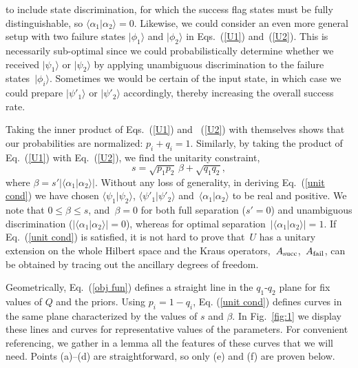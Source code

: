 \documentclass[aps,pra,twocolumn,showpacs]{revtex4-1}
\begin{document}
{to include state discrimination, for which the success flag states must be fully distinguishable, so $\langle\alpha_1|\alpha_2\rangle=0$.
%
Likewise, we could consider an even more general setup with two failure states $|\phi_1\rangle$ and $|\phi_2\rangle$ in Eqs.~(\ref{U1}) and~(\ref{U2}). This is necessarily sub-optimal since we could probabilistically determine whether we received $|{\psi_1}\rangle$ or $|{\psi_2}\rangle$ by applying unambiguous discrimination to the failure states~$| {\phi_i}\rangle$.  Sometimes we would be  certain of the input state, in which case we could  prepare $|\psi'_1\rangle$ or $|\psi'_2\rangle$ accordingly,  thereby increasing the overall success rate.
%
%

Taking the inner product of Eqs.~(\ref{U1}) and ~(\ref{U2}) with themselves shows that our probabilities are normalized: $p_i+q_i=1$.
Similarly, by taking the product of Eq.~(\ref{U1}) with Eq.~(\ref{U2}), we find the unitarity constraint,
%
\begin{equation}
s=\sqrt{p_1 p_2}\, \beta+\sqrt{q_1 q_2},
\label{unit cond}
\end{equation}
%
where $\beta=s' |\langle \alpha_1|\alpha_2\rangle|$. Without any loss of generality, in deriving Eq.~(\ref{unit cond}) we have chosen
$\langle {\psi_1}|{\psi_2}\rangle$, $\langle {\psi'_1}|{\psi'_2}\rangle$ and~$\langle\alpha_1|\alpha_2\rangle$ to be real and positive.
We note that $0\le\beta\le s$, and~$\beta=0$ for both full separation ($s'=0$) and unambiguous discrimination ($ |\langle \alpha_1|\alpha_2\rangle|=0$), whereas for optimal separation~$|\langle \alpha_1|\alpha_2\rangle|=1$. If Eq.~(\ref{unit cond}) is satisfied, it is not hard to prove that~$U$ has a unitary extension on the whole Hilbert space and the Kraus operators,~\mbox{$A_{\rm succ}$, $A_{\rm fail}$,} can be obtained by tracing out the ancillary degrees of freedom.

Geometrically, Eq.~(\ref{obj fun}) defines a straight line in the $q_1$-$q_2$ plane for fix values of $Q$ and the priors. Using $p_i=1-q_i$, Eq. (\ref{unit cond}) defines curves in the same plane characterized by the values of $s$ and $\beta$. In Fig.~\ref{fig:1} we display these lines and  curves for representative values of the parameters. 
%
For convenient referencing, we gather in a lemma all the features of these curves that we will need.  Points (a)--(d) are straightforward, so only (e) and (f) are proven below.

}
\end{document}
